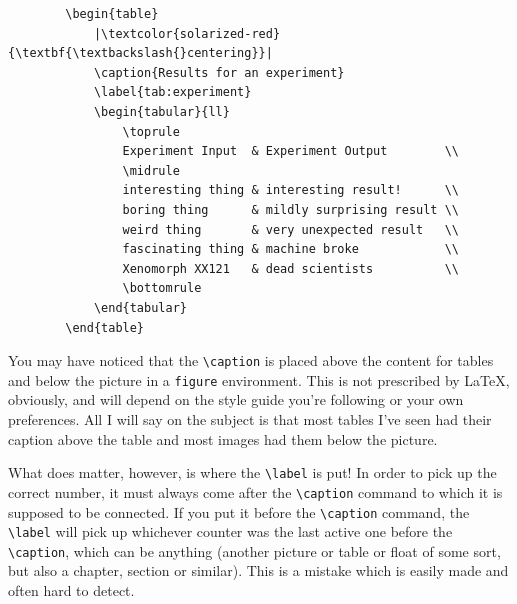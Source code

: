 \documentclass[article,a4paper,oneside,10pt]{memoir}
\begin{document}
\begin{listing}
    \begin{verbatim}
        \begin{table}
            |\textcolor{solarized-red}{\textbf{\textbackslash{}centering}}|
            \caption{Results for an experiment}
            \label{tab:experiment}
            \begin{tabular}{ll}
                \toprule
                Experiment Input  & Experiment Output        \\
                \midrule
                interesting thing & interesting result!      \\
                boring thing      & mildly surprising result \\
                weird thing       & very unexpected result   \\
                fascinating thing & machine broke            \\
                Xenomorph XX121   & dead scientists          \\
                \bottomrule
            \end{tabular}
        \end{table}
    \end{verbatim}
    \caption{%
        Centering  a  \texttt{tabular}   environment  inside  a \texttt{table}
        floating environment}
    \label{lst:centering}
\end{listing}

You may have noticed that the  \verb|\caption| is placed above the content for
tables  and below  the picture  in  a \verb|figure|  environment. This is  not
prescribed by  \LaTeX, obviously, and  will depend  on the style  guide you're
following or your own preferences. All I will  say on the subject is that most
tables I've seen  had their caption above  the table and most  images had them
below the picture.

\textcolor{solarized-red}{What   does   matter,    however,   is   where   the
\texttt{\textbackslash{}label}  is  put!} In  order  to pick  up  the  correct
number, it must  always come after the \verb|\caption| command  to which it is
supposed to  be connected. If you  put it before the  \verb|\caption| command,
the  \verb|\label| will  pick up  whichever counter  was the  last active  one
before the \verb|\caption|, which can be anything (another picture or table or
float of some sort, but also a chapter, section or similar). This is a mistake
which is easily made and often hard to detect.
\end{document}
